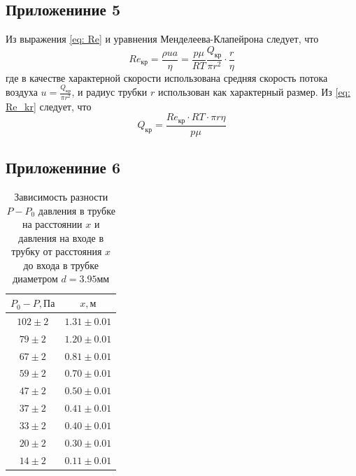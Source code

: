 \subsection{Приложениние 5} \label{Приложение 5}

Из выражения \eqref{eq: Re} и уравнения Менделеева-Клапейрона следует, что
\begin{equation}
    Re_\text{кр} = \frac{\rho u a}{\eta} = \frac{p\mu}{RT} \frac{Q_\text{кр}}{\pi r^2}\cdot \frac{r}{\eta} \label{eq: Re_kr}
\end{equation}
где в качестве характерной скорости использована средняя скорость потока воздуха $u = \frac{Q_\text{кр}}{\pi r^2}$, и радиус трубки $r$ использован как характерный размер. 
Из \eqref{eq: Re_kr} следует, что
\begin{equation}
    Q_\text{кр} = \frac{Re_\text{кр}\cdot RT\cdot \pi r\eta}{p\mu} \label{eq: Q_kr}
\end{equation}

\subsection{Приложениние 6} \label{Приложение 6}

\begin{table}[ht]
\begin{tabular}{|c|c|}
 \hline
$P_0-P, \text{Па}$ & $x, \text{м}$ \\
 \hline
$102 \pm 2$ & $1.31 \pm 0.01$  \\  \hline
$79\pm 2$ & $1.20 \pm 0.01$ \\ \hline
$67\pm 2$ & $0.81\pm 0.01$  \\ \hline
$59\pm 2$ & $0.70\pm 0.01$  \\ \hline
$47\pm 2$ & $0.50\pm 0.01$  \\ \hline
$37\pm 2$ & $0.41\pm 0.01$  \\ \hline
$33\pm 2$ & $0.40\pm 0.01$  \\ \hline
$20\pm 2$ & $0.30\pm 0.01$  \\ \hline
$14\pm 2$ & $0.11\pm 0.01$  \\ \hline
\end{tabular}
\caption{Зависимость разности $P-P_0$ давления в трубке на расстоянии $x$ и давления на входе в трубку от расстояния $x$ до входа в трубке диаметром $d = 3.95\text{мм}$}
\end{table}

